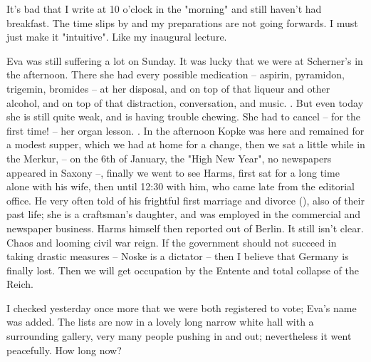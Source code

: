 
It's bad that I write at 10 o'clock in the "morning" and still haven't had breakfast. The time slips by and my preparations are not going forwards. I must just make it "intuitive". Like my inaugural lecture.

Eva was still suffering a lot on Sunday. It was lucky that we were at Scherner's in the afternoon. There she had every possible medication -- aspirin, pyramidon, trigemin, bromides -- at her disposal, and on top of that liqueur and other alcohol, and on top of that distraction, conversation, and music. \missing. But even today she is still quite weak, and is having trouble chewing. She had to cancel -- for the first time! -- her organ lesson. \missing. In the afternoon Kopke was here and remained for a modest supper, which we had at home for a change, then we sat a little while in the Merkur,  -- on the 6th of January, the "High New Year", no newspapers appeared in Saxony --, finally we went to see Harms, first sat for a long time alone with his wife, then until 12:30 with him, who came late from the editorial office. He very often told of his frightful first marriage and divorce (), also of their past life; she is a craftsman's daughter, and was employed in the commercial and newspaper business. Harms himself then reported out of Berlin. It still isn't clear. Chaos and looming civil war reign. If the government should not succeed in taking drastic measures -- Noske is a dictator -- then I believe that Germany is finally lost. Then we will get occupation by the Entente and total collapse of the Reich.

\missing

I checked yesterday once more that we were both registered to vote; Eva's name was added. The lists are now in a lovely long narrow white hall with a surrounding gallery, very many people pushing in and out; nevertheless it went peacefully. How long now?

